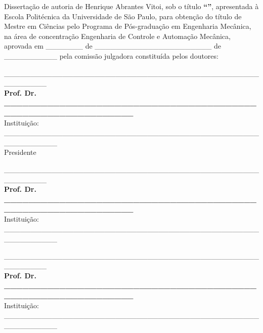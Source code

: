 \imprimircapa
\imprimirfolhaderosto*

\begin{fichacatalografica}
    
\end{fichacatalografica}

\begin{folhadeaprovacao}

	\noindent Dissertação de autoria de Henrique Abrantes Vitoi, sob o título \textbf{``\imprimirtitulo''}, apresentada à Escola Politécnica da Universidade de São Paulo, para obtenção do título de Mestre em Ciências pelo Programa de Pós-graduação em Engenharia Mecânica, na área de concentração Engenharia de Controle e Automação Mecânica, aprovada em \_\_\_\_\_\_\_ de \_\_\_\_\_\_\_\_\_\_\_\_\_\_\_\_\_\_\_\_\_\_ de \_\_\_\_\_\_\_\_\_\_ pela comissão julgadora constituída pelos doutores:
	\vspace*{3cm}
	\begin{center}
		\_\_\_\_\_\_\_\_\_\_\_\_\_\_\_\_\_\_\_\_\_\_\_\_\_\_\_\_\_\_\_\_\_\_\_\_\_\_\_\_\_\_\_\_\_\_\_\_\_\_\_\_\_\_\_\_
		\vspace*{0.2cm} 
		\\ \textbf{Prof. Dr. \_\_\_\_\_\_\_\_\_\_\_\_\_\_\_\_\_\_\_\_\_\_\_\_\_\_\_\_\_\_\_\_\_\_\_\_\_\_\_\_\_\_\_\_\_\_\_\_\_\_\_\_\_\_\_\_\_\_\_\_\_\_} 
		\\ \vspace*{0.2cm} 
		Instituição: \_\_\_\_\_\_\_\_\_\_\_\_\_\_\_\_\_\_\_\_\_\_\_\_\_\_\_\_\_\_\_\_\_\_\_\_\_\_\_\_\_\_\_\_\_\_\_\_\_\_\_\_\_\_\_\_\_\_ 
		\\ \vspace*{0.2cm}
		Presidente 

		\vspace*{2cm}

		\_\_\_\_\_\_\_\_\_\_\_\_\_\_\_\_\_\_\_\_\_\_\_\_\_\_\_\_\_\_\_\_\_\_\_\_\_\_\_\_\_\_\_\_\_\_\_\_\_\_\_\_\_\_\_\_
		\vspace*{0.2cm} 
		\\ \textbf{Prof. Dr. \_\_\_\_\_\_\_\_\_\_\_\_\_\_\_\_\_\_\_\_\_\_\_\_\_\_\_\_\_\_\_\_\_\_\_\_\_\_\_\_\_\_\_\_\_\_\_\_\_\_\_\_\_\_\_\_\_\_\_\_\_\_} 
		\\ \vspace*{0.2cm} 
		Instituição: \_\_\_\_\_\_\_\_\_\_\_\_\_\_\_\_\_\_\_\_\_\_\_\_\_\_\_\_\_\_\_\_\_\_\_\_\_\_\_\_\_\_\_\_\_\_\_\_\_\_\_\_\_\_\_\_\_\_

		\vspace*{2cm}

		\_\_\_\_\_\_\_\_\_\_\_\_\_\_\_\_\_\_\_\_\_\_\_\_\_\_\_\_\_\_\_\_\_\_\_\_\_\_\_\_\_\_\_\_\_\_\_\_\_\_\_\_\_\_\_\_
		\vspace*{0.2cm} 
		\\ \textbf{Prof. Dr. \_\_\_\_\_\_\_\_\_\_\_\_\_\_\_\_\_\_\_\_\_\_\_\_\_\_\_\_\_\_\_\_\_\_\_\_\_\_\_\_\_\_\_\_\_\_\_\_\_\_\_\_\_\_\_\_\_\_\_\_\_\_} 
		\\ \vspace*{0.2cm} 
		Instituição: \_\_\_\_\_\_\_\_\_\_\_\_\_\_\_\_\_\_\_\_\_\_\_\_\_\_\_\_\_\_\_\_\_\_\_\_\_\_\_\_\_\_\_\_\_\_\_\_\_\_\_\_\_\_\_\_\_\_


\end{center}
\end{folhadeaprovacao}
